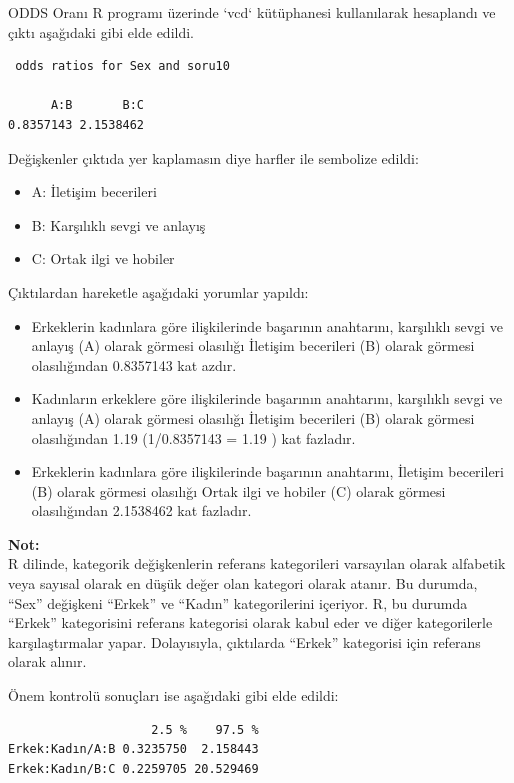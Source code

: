\documentclass{article}
\begin{document}
ODDS Oranı R programı üzerinde `vcd` kütüphanesi kullanılarak hesaplandı ve çıktı aşağıdaki gibi elde edildi.

\begin{verbatim}
 odds ratios for Sex and soru10 

      A:B       B:C 
0.8357143 2.1538462
\end{verbatim}

Değişkenler çıktıda yer kaplamasın diye harfler ile sembolize edildi:
\begin{itemize}
    \item A: İletişim becerileri
    \item B: Karşılıklı sevgi ve anlayış
    \item C: Ortak ilgi ve hobiler
\end{itemize}

\vspace{10pt}

Çıktılardan hareketle aşağıdaki yorumlar yapıldı:
\begin{itemize}
    \item Erkeklerin kadınlara göre ilişkilerinde başarının anahtarını, karşılıklı sevgi ve anlayış (A) olarak görmesi olasılığı İletişim becerileri (B) olarak görmesi olasılığından 0.8357143 kat azdır.
    \item Kadınların erkeklere göre ilişkilerinde başarının anahtarını, karşılıklı sevgi ve anlayış (A) olarak görmesi olasılığı İletişim becerileri (B) olarak görmesi olasılığından 1.19 (1/0.8357143 = 1.19 ) kat fazladır.
    \item Erkeklerin kadınlara göre ilişkilerinde başarının anahtarını, İletişim becerileri (B) olarak görmesi olasılığı Ortak ilgi ve hobiler (C) olarak görmesi olasılığından 2.1538462 kat fazladır.
\end{itemize}

\textbf{Not:} \\
R dilinde, kategorik değişkenlerin referans kategorileri varsayılan olarak alfabetik veya sayısal olarak en düşük değer olan kategori olarak atanır.
Bu durumda, “Sex” değişkeni “Erkek” ve “Kadın” kategorilerini içeriyor. R, bu durumda “Erkek” kategorisini referans kategorisi olarak kabul eder ve diğer kategorilerle karşılaştırmalar yapar. Dolayısıyla, çıktılarda “Erkek” kategorisi için referans olarak alınır.

Önem kontrolü sonuçları ise aşağıdaki gibi elde edildi:
\begin{verbatim}
                    2.5 %    97.5 %
Erkek:Kadın/A:B 0.3235750  2.158443
Erkek:Kadın/B:C 0.2259705 20.529469    
\end{verbatim}
\end{document}
